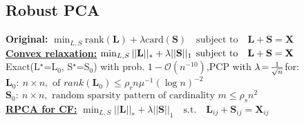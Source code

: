 \documentclass[a4paper,11pt]{article}
\begin{document}
\begin{multicols}{2}
\section{Robust PCA}
\textbf{Original:} $\min_{L, S} \text{rank}(\mathbf{L}) + \lambda \text{card}(\mathbf{S}) \quad \text{subject to} \quad \mathbf{L} + \mathbf{S} = \mathbf{X}$\\
\underline{\textbf{Convex relaxation:}} $\min_{L, S} ||\mathbf{L}||_* + \lambda ||\mathbf{S}||_1  \hspace{-0.1cm} \quad  \hspace{-0.1cm}\text{subject to} \quad \mathbf{L} + \mathbf{S} = \mathbf{X}$\\
Exact(L$^\star$=L$_0$, S$^\star$=S$_0$) with prob. $1-\mathcal O(n^{-10})$,PCP with $\lambda  \hspace{-0.05cm} =  \hspace{-0.05cm} {1 \over \sqrt n}$for:\\
\hspace{0.2cm}$\mathbf L_0:\ n\times n, \text{ of } rank(\mathbf L_0)\leq \rho_r n \mu^{-1} (\log n)^{-2}$\\
\hspace{0.2cm}$\mathbf S_0:\ n\times n, \text{ random sparsity pattern of cardinality }m \leq \rho_s n^2$\\
\underline{\textbf{RPCA for CF:}}
$\min_{L, S} ||\mathbf{L}||_* + \lambda ||\mathbf{S}||_1 \quad \text{s.t.} \quad \mathbf{L}_{ij} + \mathbf{S}_{ij} = \mathbf{X}_{ij}$
\end{multicols}%
\end{document}
